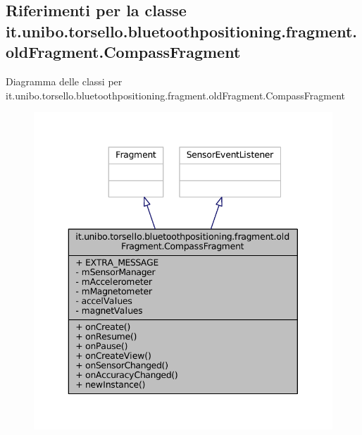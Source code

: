 \hypertarget{classit_1_1unibo_1_1torsello_1_1bluetoothpositioning_1_1fragment_1_1oldFragment_1_1CompassFragment}{}\subsection{Riferimenti per la classe it.\+unibo.\+torsello.\+bluetoothpositioning.\+fragment.\+old\+Fragment.\+Compass\+Fragment}
\label{classit_1_1unibo_1_1torsello_1_1bluetoothpositioning_1_1fragment_1_1oldFragment_1_1CompassFragment}


Diagramma delle classi per it.\+unibo.\+torsello.\+bluetoothpositioning.\+fragment.\+old\+Fragment.\+Compass\+Fragment
\nopagebreak
\begin{figure}[H]
\begin{center}
\leavevmode
\includegraphics[width=343pt]{classit_1_1unibo_1_1torsello_1_1bluetoothpositioning_1_1fragment_1_1oldFragment_1_1CompassFragment__inherit__graph}
\end{center}
\end{figure}


